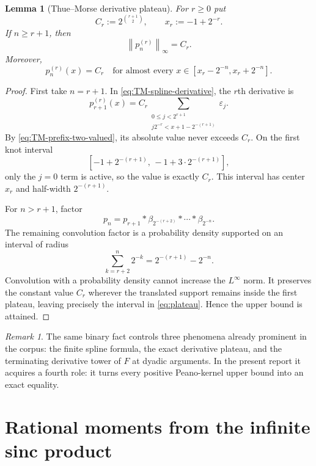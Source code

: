 \documentclass[11pt]{article}
\numberwithin{equation}{section}
\newtheorem{lemma}[theorem]{Lemma}
\theoremstyle{definition}
\theoremstyle{remark}
\newtheorem{remark}[theorem]{Remark}
\newcommand{\norm}[1]{\left\lVert#1\right\rVert}
\newcommand{\TM}{\varepsilon}
\begin{document}
\begin{lemma}[Thue--Morse derivative plateau]
\label{lem:plateau}
For $r\ge0$ put
\begin{equation}
 C_r:=2^{\binom{r+1}{2}},
 \qquad
 x_r:=-1+2^{-r}.
 \label{eq:Cr-xr}
\end{equation}
If $n\ge r+1$, then
\begin{equation}
 \boxed{\norm{p_n^{(r)}}_\infty=C_r.}
 \label{eq:derivative-norm}
\end{equation}
Moreover,
\begin{equation}
 p_n^{(r)}(x)=C_r
 \quad\text{for almost every }x\in[x_r-2^{-n},x_r+2^{-n}].
 \label{eq:plateau}
\end{equation}
\end{lemma}

\begin{proof}
First take $n=r+1$.  In \eqref{eq:TM-spline-derivative}, the $r$th derivative is
\[
 p_{r+1}^{(r)}(x)=C_r
 \sum_{\substack{0\le j<2^{r+1}\\ j2^{-r}<x+1-2^{-(r+1)}}}\TM_j.
\]
By \eqref{eq:TM-prefix-two-valued}, its absolute value never exceeds $C_r$.  On the first knot interval
\[
 [-1+2^{-(r+1)},\,-1+3\cdot2^{-(r+1)}],
\]
only the $j=0$ term is active, so the value is exactly $C_r$.  This interval has center $x_r$ and half-width $2^{-(r+1)}$.

For $n>r+1$, factor
\[
 p_n=p_{r+1}*\beta_{2^{-(r+2)}}*\cdots*\beta_{2^{-n}}.
\]
The remaining convolution factor is a probability density supported on an interval of radius
\[
 \sum_{k=r+2}^{n}2^{-k}=2^{-(r+1)}-2^{-n}.
\]
Convolution with a probability density cannot increase the $L^\infty$ norm.  It preserves the constant value $C_r$ wherever the translated support remains inside the first plateau, leaving precisely the interval in \eqref{eq:plateau}.  Hence the upper bound is attained.
\end{proof}

\begin{remark}
The same binary fact controls three phenomena already prominent in the corpus: the finite spline formula, the exact derivative plateau, and the terminating derivative tower of $F$ at dyadic arguments.  In the present report it acquires a fourth role: it turns every positive Peano-kernel upper bound into an exact equality.
\end{remark}

\section{Rational moments from the infinite sinc product}
\label{sec:moments}
\end{document}
